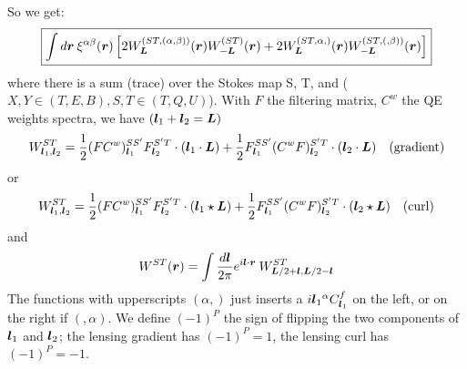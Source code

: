 \documentclass[prd, superscriptaddress, tightenlines, longbibliography, nofootinbib, eqsecnum, amsfonts, amsmath, floatfix, onecolumn, notitlepage]{revtex4-2}
\begin{document}
So we get:
\begin{equation}\label{eq:rfftN1}\boxed{
 \int d\boldsymbol{r} \:	\xi^{\alpha \beta}(\boldsymbol{r}) \left[2W^{(ST, (\alpha, \beta))}_{\boldsymbol{L}}(\boldsymbol{r})W^{(ST)}_{-\boldsymbol{L}}(\boldsymbol{r}) + 2 W^{(ST, \alpha,)}_{\boldsymbol{L}}(\boldsymbol{r})W^{(ST, (,\beta))}_{-\boldsymbol{L}}(\boldsymbol{r})\right]}
\end{equation}
where there is a sum (trace) over the Stokes map S, T, and ($X, Y \in (T, E ,B), S, T \in (T, Q, U)$). With $F$ the filtering matrix, $C^w$ the QE weights spectra, we have $(\boldsymbol{l}_1 + \boldsymbol{l}_2 = \boldsymbol{L})$
\begin{equation}
	W^{ST}_{\boldsymbol{l}_1,\boldsymbol{l}_2} = \frac 12 (FC^{w})^{SS'}_{\boldsymbol{l}_1} F_{\boldsymbol{l}_2}^{S'T} \cdot (\boldsymbol{l}_1\cdot \boldsymbol{L}) + \frac 12 F^{SS'}_{\boldsymbol{l}_1} (C^wF)_{\boldsymbol{l}_2}^{S'T} \cdot (\boldsymbol{l}_2\cdot \boldsymbol{L})\quad (\textrm{gradient})
\end{equation}
or
\begin{equation}
	W^{ST}_{\boldsymbol{l}_1,\boldsymbol{l}_2} = \frac 12 (FC^{w})^{SS'}_{\boldsymbol{l}_1} F_{\boldsymbol{l}_2}^{S'T} \cdot (\boldsymbol{l}_1\star \boldsymbol{L}) + \frac 12 F^{SS'}_{\boldsymbol{l}_1} (C^wF)_{\boldsymbol{l}_2}^{S'T} \cdot (\boldsymbol{l}_2\star \boldsymbol{L})\quad (\textrm{curl})
\end{equation}
and 
\begin{equation}
	W^{ST}(\boldsymbol{r}) = \int \frac{d\boldsymbol{l}}{2\pi} e^{i \boldsymbol{l} \cdot \boldsymbol{r}} \:W^{ST}_{\boldsymbol{L} /2 +\boldsymbol{l}, \boldsymbol{L}/2 - \boldsymbol{l}} 
\end{equation}
The functions with upperscripts $(\alpha,)$ just inserts a $i{\boldsymbol{l}}{_1}^{\alpha} C^{f}_{\boldsymbol{l}_1}$ on the left, or on the right if $(,\alpha)$.
We define $(-1)^P$ the sign of flipping the two components of $\boldsymbol{l}_1$ and $\boldsymbol{l}_2$; the lensing gradient has $(-1)^P = 1$, the lensing curl has $(-1)^P = -1$.
\end{document}
